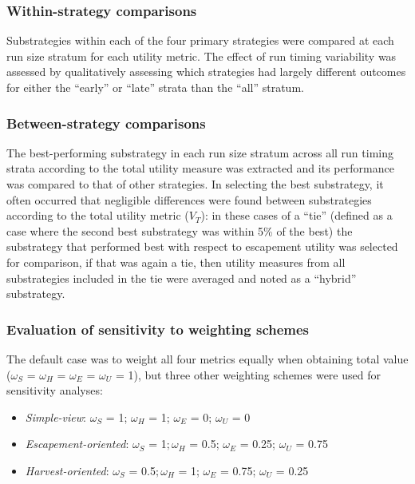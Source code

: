 \documentclass[12pt,]{book}
\theoremstyle{definition}
\theoremstyle{definition}
\theoremstyle{definition}
\theoremstyle{remark}
\begin{document}
\subsubsection{Within-strategy
comparisons}\label{within-strategy-comparisons}

\noindent
Substrategies within each of the four primary strategies were compared
at each run size stratum for each utility metric. The effect of run
timing variability was assessed by qualitatively assessing which
strategies had largely different outcomes for either the ``early'' or
``late'' strata than the ``all'' stratum.

\subsubsection{Between-strategy
comparisons}\label{between-strategy-comparisons}

\noindent
The best-performing substrategy in each run size stratum across all run
timing strata according to the total utility measure was extracted and
its performance was compared to that of other strategies. In selecting
the best substrategy, it often occurred that negligible differences were
found between substrategies according to the total utility metric
(\(V_T\)): in these cases of a ``tie'' (defined as a case where the
second best substrategy was within 5\% of the best) the substrategy that
performed best with respect to escapement utility was selected for
comparison, if that was again a tie, then utility measures from all
substrategies included in the tie were averaged and noted as a
``hybrid'' substrategy.

\subsubsection{Evaluation of sensitivity to weighting
schemes}\label{alt-weights}

\noindent
The default case was to weight all four metrics equally when obtaining
total value (\(\omega_S\) = \(\omega_H\) = \(\omega_E\) = \(\omega_U\) =
1), but three other weighting schemes were used for sensitivity
analyses:

\begin{itemize}
\item
  \emph{Simple-view}: \(\omega_S\) = 1; \(\omega_H\) = 1; \(\omega_E\) =
  0; \(\omega_U\) = 0
\item
  \emph{Escapement-oriented}: \(\omega_S\) = 1\(; \omega_H\) = 0.5;
  \(\omega_E\) = 0.25; \(\omega_U\) = 0.75
\item
  \emph{Harvest-oriented}: \(\omega_S\) = 0.5\(; \omega_H\) = 1;
  \(\omega_E\) = 0.75; \(\omega_U\) = 0.25
\end{itemize}
\end{document}

